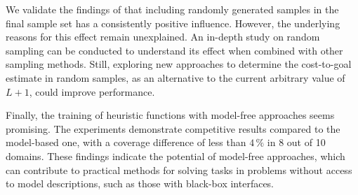 We validate the findings of \citet{otoole2022sampling} that including randomly generated samples in the final sample set has a consistently positive influence. However, the underlying reasons for this effect remain unexplained. An in-depth study on random sampling can be conducted to understand its effect when combined with other sampling methods. Still, exploring new approaches to determine the cost-to-goal estimate in random samples, as an alternative to the current arbitrary value of $L+1$, could improve performance.

Finally, the training of heuristic functions with model-free approaches seems promising. The experiments demonstrate competitive results compared to the model-based one, with a coverage difference of less than $4\,\%$ in 8 out of 10 domains. These findings indicate the potential of model-free approaches, which can contribute to practical methods for solving tasks in problems without access to model descriptions, such as those with black-box interfaces.
